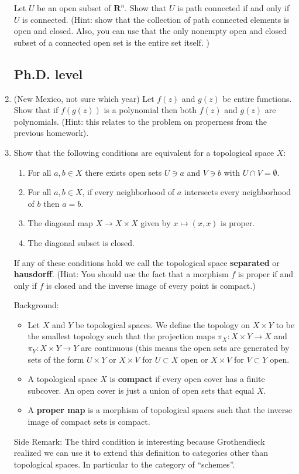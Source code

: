 \documentclass[a4paper,10pt]{article}
\newcommand{\RR}{\mathbf{R}}
\begin{document}
\begin{enumerate}
Let $U$ be an open subset of $\RR^n$. Show that $U$ is path connected if and only if $U$ is connected. (Hint: show that the collection of path connected elements is open and closed. Also, you can use that the only nonempty open and closed subset of a connected open set is the entire set itself. )


\subsection*{Ph.D. level}


\item (New Mexico, not sure which year) 
Let $f(z)$ and $g(z)$ be entire functions. 
Show that if $f(g(z))$ is a polynomial then both $f(z)$ and $g(z)$ are polynomials.
(Hint: this relates to the problem on properness from the previous homework).

\item 
Show that the following conditions are equivalent for a topological space $X$:
  \begin{enumerate}
  \item For all $a,b \in X$ there exists open sets $U \owns a$ and $V \owns b$ with $U \cap V = \emptyset$. 
  \item For all $a,b\in X$, if every neighborhood of $a$ intersects every neighborhood of $b$ then $a = b$.
  \item The diagonal map $X \to X\times X$ given by $x\mapsto (x,x)$ is proper. 
  \item The diagonal subset is closed. 
  \end{enumerate}


If any of these conditions hold we call the topological space \textbf{separated} or \textbf{hausdorff}. (Hint: You should use the fact that a morphism $f$ is proper if and only if $f$ is closed and the inverse image of every point is compact.)

Background: 
	\begin{itemize}
	\item Let $X$ and $Y$ be topological spaces. We define the topology on $X\times Y$ to be the smallest topology such that the projection maps $\pi_X: X \times Y \to X$ and $\pi_Y: X\times Y \to Y$ are continuous (this means the open sets are generated by sets of the form $U \times Y$ or $X\times V$ for $U\subset X$ open or $X \times V$ for $V\subset Y$ open. 
	\item A topological space $X$ is \textbf{compact} if every open cover has a finite subcover. An open cover is just a union of open sets that equal $X$.
	\item A \textbf{proper map} is a morphism of topological spaces such that the inverse image of compact sets is compact. 
	\end{itemize}

Side Remark: The third condition is interesting because Grothendieck realized we can use it to extend this definition to categories other than topological spaces. In particular to the category of ``schemes''.

\end{enumerate}
\end{document}
